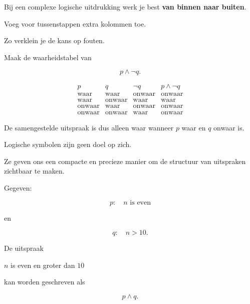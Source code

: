 \documentclass{ximera}
\begin{document}
  \begin{opmerking}
  Bij een complexe logische uitdrukking werk je best
  \textbf{van binnen naar buiten}.

  Voeg voor tussenstappen extra kolommen toe.

  Zo verklein je de kans op fouten.
  \end{opmerking}


  \begin{oefening}{\oefB \ESS}

  Maak de waarheidstabel van

  \[
  p\land\neg q.
  \]

  \begin{oplossing}

  \[
  \begin{array}{c|c|c|c}
  p&q&\neg q&p\land\neg q\\
  \hline
  \text{waar}&\text{waar}&\text{onwaar}&\text{onwaar}\\
  \text{waar}&\text{onwaar}&\text{waar}&\text{waar}\\
  \text{onwaar}&\text{waar}&\text{onwaar}&\text{onwaar}\\
  \text{onwaar}&\text{onwaar}&\text{waar}&\text{onwaar}
  \end{array}
  \]

  De samengestelde uitspraak is dus alleen waar wanneer
  $p$ waar en $q$ onwaar is.
  \end{oplossing}

  \end{oefening}



  Logische symbolen zijn geen doel op zich.

  Ze geven ons een compacte en precieze manier om de structuur van
  uitspraken zichtbaar te maken.


  \begin{voorbeeld}

  Gegeven:

  \[
  p:\quad n\text{ is even}
  \]

  en

  \[
  q:\quad n>10.
  \]

  De uitspraak

  \begin{center}
  $n$ is even en groter dan $10$
  \end{center}

  kan worden geschreven als

  \[
  p\land q.
  \]
  \end{voorbeeld}
\end{document}
